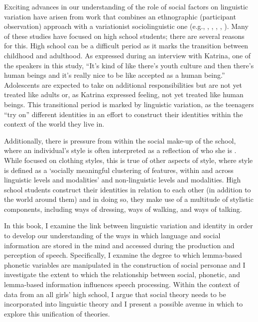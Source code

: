 Exciting advances in our understanding of the role of social factors on linguistic variation have arisen from work that combines an ethnographic (participant observation) approach with a variationist sociolinguistic one (e.g., , , , , ).  Many of these studies have focused on high school students; there are several reasons for this.  High school can be a difficult period as it marks the transition between childhood and adulthood.  As expressed during an interview with Katrina, one of the speakers in this study, "`It's kind of like there's youth culture and then there's human beings and it's really nice to be like accepted as a human being."'  Adolescents are expected to take on additional responsibilities but are not yet treated like adults or, as Katrina expressed feeling, not yet treated like human beings.  This transitional period is marked by linguistic variation, as the teenagers "`try on"' different identities in an effort to construct their identities within the context of the world they live in.

Additionally, there is pressure from within the social make-up of the school, where an individual's style is often interpreted as a reflection of who she is \cite[2]{pomerantz2008}.  While  focused on clothing styles, this is true of other aspects of style, where style is defined as a `socially meaningful clustering of features, within and across linguistic levels and modalities' \cite{campbellkibleretal2006} and non-linguistic levels and modalities. High school students construct their identities in relation to each other (in addition to the world around them) and in doing so, they make use of a multitude of stylistic components, including ways of dressing, ways of walking, and ways of talking.  

In this book, I examine the link between linguistic variation and identity in order to develop our understanding of the ways in which language and social information are stored in the mind and accessed during the production and perception of speech.  Specifically, I examine the degree to which lemma-based phonetic variables are manipulated in the construction of social personae and I investigate the extent to which the relationship between social, phonetic, and lemma-based information influences speech processing.  Within the context of data from an all girls' high school, I argue that social theory needs to be incorporated into linguistic theory and I present a possible avenue in which to explore this unification of theories.  

